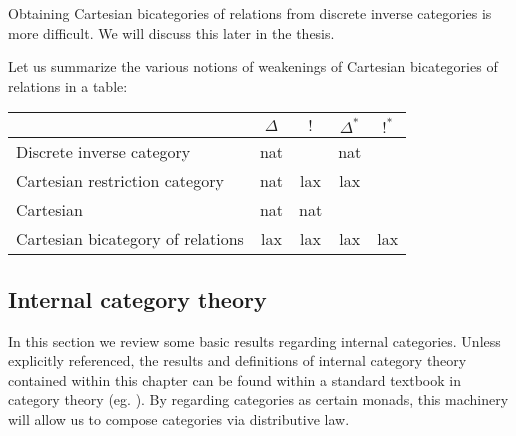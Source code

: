 Obtaining Cartesian bicategories of relations from discrete inverse categories is more difficult.  We will discuss this later in the thesis.


Let us summarize the various notions of weakenings of Cartesian bicategories of relations in a table:


\hfil
\begin{tabular}{l|cccc}
                                                     & $\Delta$          & $!$             & $\Delta^*$         & $!^*$\\
\hline
Discrete inverse category            & nat &  & nat  & \\
Cartesian restriction category      & nat &  lax  & lax \\
Cartesian                                      & nat & nat &   \\
Cartesian bicategory of relations & lax  & lax & lax & lax \\
\end{tabular}


\subsection{Internal category theory}
\label{subsec:internal}
%
%
%
%
%
%
%



In this section we review some basic results regarding internal categories.  Unless explicitly referenced, the results and definitions of internal category theory contained within this chapter can be found within a standard textbook in category theory (eg. \cite{maclane}).  By regarding categories as certain monads, this machinery will allow us to compose categories via distributive law. 


